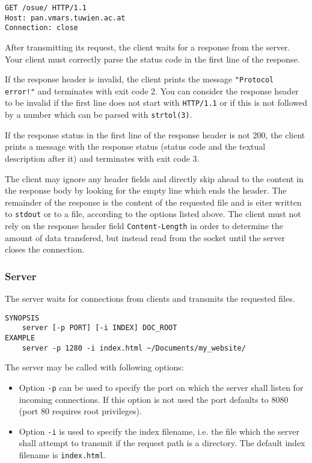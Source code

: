 \begin{verbatim}
GET /osue/ HTTP/1.1
Host: pan.vmars.tuwien.ac.at
Connection: close
\end{verbatim}

After transmitting its request, the client waits for a response from the server.
Your client must correctly parse the status code
in the first line of the response.

If the response header is invalid,
the client prints the message \texttt{"Protocol error!"}
and terminates with exit code 2.
You can consider the response header to be invalid
if the first line does not start with \verb|HTTP/1.1|
or if this is not followed by a number
which can be parsed with \verb|strtol(3)|.

If the response status in the first line of the response header is not 200,
the client prints a message with the response status
(status code and the textual description after it)
and terminates with exit code 3.

The client may ignore any header fields
and directly skip ahead to the content in the response body
by looking for the empty line which ends the header.
The remainder of the response is the content of the requested file
and is eiter written to \verb|stdout| or to a file,
according to the options listed above.
The client must not rely on the response header field \verb|Content-Length|
in order to determine the amount of data transfered,
but instead read from the socket until the server closes the connection.

\subsubsection*{Server}

The server waits for connections from clients
and transmits the requested files.

\begin{verbatim}
SYNOPSIS
    server [-p PORT] [-i INDEX] DOC_ROOT
EXAMPLE
    server -p 1280 -i index.html ~/Documents/my_website/
\end{verbatim}

The server may be called with following options:
\begin{itemize}
\item Option \texttt{-p} can be used to specify the port
on which the server shall listen for incoming connections.
If this option is not used the port defaults to 8080
(port 80 requires root privileges).
\item Option \texttt{-i} is used to specify the index filename,
i.e. the file which the server shall attempt to transmit
if the request path is a directory.
The default index filename is \verb|index.html|.
\end{itemize}

